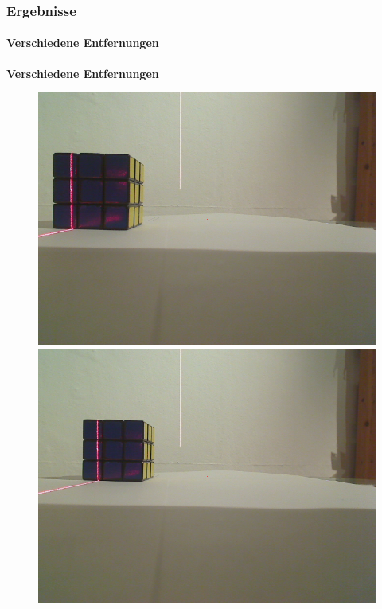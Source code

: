 \documentclass[xcolor=dvipsnames]{beamer}
\begin{document}
\begin{frame}
	\frametitle{Ergebnisse}
	\framesubtitle{Verschiedene Entfernungen}
	
	\textbf{Verschiedene Entfernungen}

	\begin{figure}
		\begin{minipage}{0.32\linewidth}
			\includegraphics[width=\linewidth]{includes/test_dist_1}
		\end{minipage}
		\hfill
		\begin{minipage}{0.32\linewidth}
			\includegraphics[width=\linewidth]{includes/test_dist_2}

\end{minipage}
\end{figure}
\end{frame}
\end{document}
